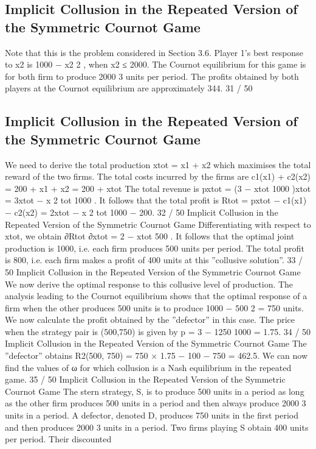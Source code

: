 \documentclass[]{report}
\begin{document}
\subsection{Implicit Collusion in the Repeated Version of the
Symmetric Cournot Game}
Note that this is the problem considered in Section 3.6.
Player 1’s best response to x2 is 1000 −
x2
2
, when x2 ≤ 2000.
The Cournot equilibrium for this game is for both firm to produce
2000
3
units per period.
The profits obtained by both players at the Cournot equilibrium are
approximately 344.
31 / 50
\subsection{Implicit Collusion in the Repeated Version of the
Symmetric Cournot Game}
We need to derive the total production xtot = x1 + x2 which
maximises the total reward of the two firms.
The total costs incurred by the firms are
c1(x1) + c2(x2) = 200 + x1 + x2 = 200 + xtot
The total revenue is pxtot = (3 −
xtot
1000 )xtot = 3xtot −
x
2
tot
1000 .
It follows that the total profit is
Rtot = pxtot − c1(x1) − c2(x2) = 2xtot −
x
2
tot
1000 − 200.
32 / 50
Implicit Collusion in the Repeated Version of the
Symmetric Cournot Game
Differentiating with respect to xtot, we obtain
∂Rtot
∂xtot
= 2 −
xtot
500
.
It follows that the optimal joint production is 1000, i.e. each firm
produces 500 units per period.
The total profit is 800, i.e. each firm makes a profit of 400 units at
this ”collusive solution”.
33 / 50
Implicit Collusion in the Repeated Version of the
Symmetric Cournot Game
We now derive the optimal response to this collusive level of
production.
The analysis leading to the Cournot equilibrium shows that the
optimal response of a firm when the other produces 500 units is to
produce 1000 −
500
2 = 750 units.
We now calculate the profit obtained by the ”defector” in this case.
The price when the strategy pair is (500,750) is given by
p = 3 −
1250
1000 = 1.75.
34 / 50
Implicit Collusion in the Repeated Version of the
Symmetric Cournot Game
The ”defector” obtains
R2(500, 750) = 750 × 1.75 − 100 − 750 = 462.5.
We can now find the values of ω for which collusion is a Nash
equilibrium in the repeated game.
35 / 50
Implicit Collusion in the Repeated Version of the
Symmetric Cournot Game
The stern strategy, S, is to produce 500 units in a period as long
as the other firm produces 500 units in a period and then always
produce 2000
3
units in a period.
A defector, denoted D, produces 750 units in the first period and
then produces 2000
3
units in a period.
Two firms playing S obtain 400 units per period. Their discounted
\end{document}
